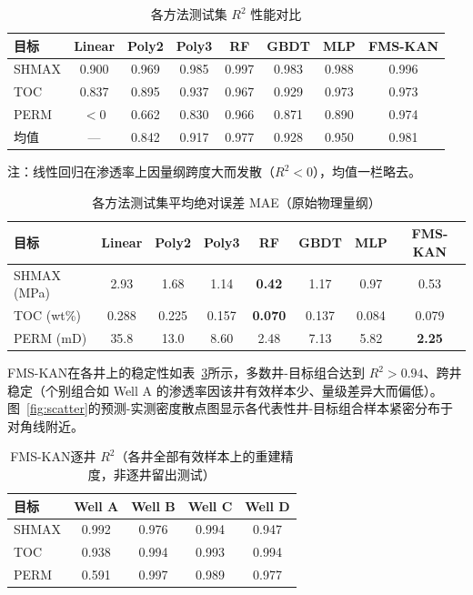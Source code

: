 \documentclass[final,3p,times,twocolumn]{elsarticle}
\begin{document}
\begin{table}[htbp]
  \centering
  \caption{各方法测试集 $R^2$ 性能对比}
  \label{tab:main}
  \small
  \begin{tabular}{lccccccc}
    \toprule
    目标 & Linear & Poly2 & Poly3 & RF & GBDT & MLP & FMS-KAN \\
    \midrule
    SHMAX & 0.900 & 0.969 & 0.985 & 0.997 & 0.983 & 0.988 & 0.996 \\
    TOC   & 0.837 & 0.895 & 0.937 & 0.967 & 0.929 & 0.973 & 0.973 \\
    PERM  & $<0$  & 0.662 & 0.830 & 0.966 & 0.871 & 0.890 & 0.974 \\
    \midrule
    均值  & ---   & 0.842 & 0.917 & 0.977 & 0.928 & 0.950 & 0.981 \\
    \bottomrule
  \end{tabular}
  \begin{flushleft}\small 注：线性回归在渗透率上因量纲跨度大而发散（$R^2<0$），均值一栏略去。\end{flushleft}
\end{table}

\begin{table}[htbp]
  \centering
  \caption{各方法测试集平均绝对误差 MAE（原始物理量纲）}
  \label{tab:mae}
  \small
  \begin{tabular}{lccccccc}
    \toprule
    目标 & Linear & Poly2 & Poly3 & RF & GBDT & MLP & FMS-KAN \\
    \midrule
    SHMAX (MPa) & 2.93 & 1.68 & 1.14 & \textbf{0.42} & 1.17 & 0.97 & 0.53 \\
    TOC (wt\%)  & 0.288 & 0.225 & 0.157 & \textbf{0.070} & 0.137 & 0.084 & 0.079 \\
    PERM (mD)   & 35.8 & 13.0 & 8.60 & 2.48 & 7.13 & 5.82 & \textbf{2.25} \\
    \bottomrule
  \end{tabular}
\end{table}

FMS-KAN在各井上的稳定性如表~\ref{tab:perwell}所示，多数井-目标组合达到 $R^2>0.94$、跨井稳定（个别组合如 Well A 的渗透率因该井有效样本少、量级差异大而偏低）。图~\ref{fig:scatter}的预测-实测密度散点图显示各代表性井-目标组合样本紧密分布于对角线附近。

\begin{table}[htbp]
  \centering
  \caption{FMS-KAN逐井 $R^2$（各井全部有效样本上的重建精度，非逐井留出测试）}
  \label{tab:perwell}
  \begin{tabular}{lcccc}
    \toprule
    目标 & Well A & Well B & Well C & Well D \\
    \midrule
    SHMAX & 0.992 & 0.976 & 0.994 & 0.947 \\
    TOC   & 0.938 & 0.994 & 0.993 & 0.994 \\
    PERM  & 0.591 & 0.997 & 0.989 & 0.977 \\
    \bottomrule
  \end{tabular}
\end{table}
\end{document}
